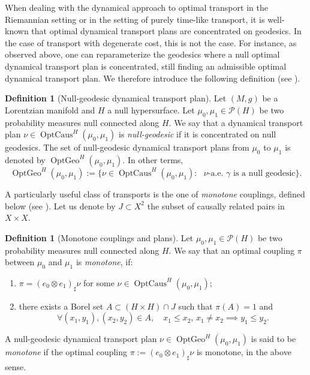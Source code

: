 \documentclass[12pt,a4paper]{amsart}
\theoremstyle{plain}
\theoremstyle{definition}
\newtheorem{definition}[lemma]{Definition}
\numberwithin{equation}{section}
\DeclareMathOperator{\OptCaus}{OptCaus}
\DeclareMathOperator{\OptGeo}{OptGeo}
\newcommand{\Prob}{\mathcal P}
\begin{document}
When dealing with the dynamical approach to optimal transport in the
Riemannian setting or in the setting of purely time-like transport,
it is well-known that optimal dynamical transport plans are
concentrated on geodesics.
%
In the case of transport with  degenerate cost, this is not the case.
%
For instance, as observed above, one can reparameterize the geodesics where a null optimal
dynamical transport plan is concentrated, still finding an admissible
optimal dynamical transport plan.
%
We therefore introduce the following definition (see ).

\begin{definition}[Null-geodesic dynamical transport plan]\label{def:nullgeodDynTPIntro}
 Let $(M,g)$ be a Lorentzian manifold and $H$ a null hypersurface.
  Let $\mu_0,\mu_1\in \Prob(H)$ be two probability measures null connected
  along $H$.
  We say that a dynamical transport plan
  $\nu\in\OptCaus^H(\mu_0,\mu_1)$ is \emph{null-geodesic} if it
  is concentrated on null geodesics.
  The set of null-geodesic dynamical transport plans from $\mu_0$ to $\mu_1$ is denoted by $\OptGeo^H(\mu_0,\mu_1)$. In other terms, 
   \begin{equation*}
\OptGeo^H(\mu_0,\mu_1) := \{ \nu \in \OptCaus^H(\mu_0,\mu_1) \colon \text{ $\nu$-a.e.\ $\gamma$ is a null geodesic}\}.
\end{equation*}
\end{definition}
A particularly useful class of transports is the one of \emph{monotone} couplings, defined below (see ). Let us denote by  $J \subset X^2$ the subset of causally related pairs in $X\times X$. 


\begin{definition} [Monotone couplings and plans]
  Let $\mu_0,\mu_1\in \Prob(H)$ be two probability measures null connected along $H$.
  We say that an optimal coupling $\pi$ between $\mu_0$ and
  $\mu_1$ is \emph{monotone}, if:
  \begin{enumerate}
  \item 
  $\pi=(e_0\otimes e_1)_{\sharp}\nu$ for some
  $\nu\in\OptCaus^H(\mu_0,\mu_1)$;
  \item there exists a Borel set
  $A\subset (H\times H)\cap J$ such that $\pi(A)=1$ and
  \begin{equation}
    \forall (x_1,y_1),(x_2,y_2)\in A
    ,
    \quad
    x_1 \leq x_2
    ,\,
    x_1\neq x_2
    \implies
    y_1 \leq y_2
    .
  \end{equation}
  \end{enumerate}
  A null-geodesic dynamical transport plan $\nu\in\OptGeo^H(\mu_0,\mu_1)$ is said to be \emph{monotone} if the  optimal coupling $\pi:=(e_0\otimes e_1)_{\sharp}\nu$ is monotone, in the above sense.
\end{definition}
\end{document}
